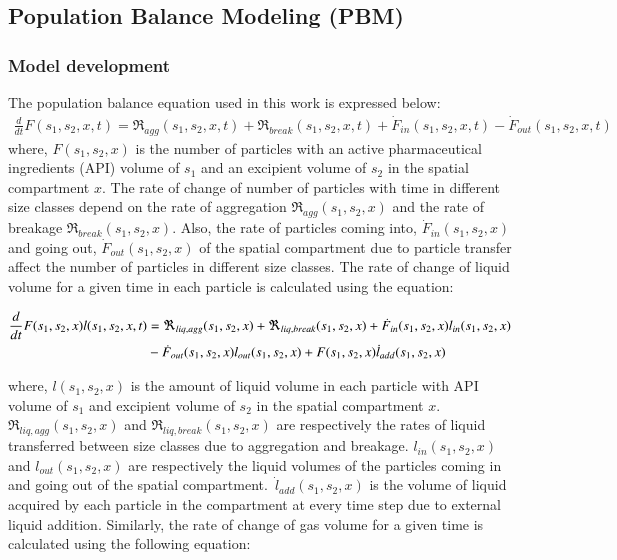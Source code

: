 \documentclass[preprint,11pt,authoryear]{elsarticle}
\begin{document}
\subsection{Population Balance Modeling (PBM)}
\label{sec:pbm_model}
\subsubsection{Model development}
 The population balance equation used in this work is expressed below:
\begin{align}
\frac{d}{dt}F(s_1,s_2,x,t)=\Re_{agg}(s_1,s_2,x,t)+\Re_{break}(s_1,s_2,x,t)+
\dot{F}_{in}(s_1,s_2,x,t)-\dot{F}_{out}(s_1,s_2,x,t)
\label{eqn:mthds_pbm_overall} 
\end{align}
where, $F(s_1,s_2,x)$ is the number of particles with an active pharmaceutical ingredients 
(API) volume of $s_1$ and an excipient 
volume of $s_2$ in the spatial compartment $x$. The rate of change of number of particles with time 
in different size classes depend on the rate of aggregation $\Re_{agg}(s_1,s_2,x)$ and the rate of 
breakage $\Re_{break}(s_1,s_2,x)$. Also, the rate of particles coming into, $\dot{F}_{in}(s_1,s_2,x)$ and 
going out, $\dot{F}_{out}(s_1,s_2,x)$ of the spatial compartment due to particle transfer affect the number of 
particles in different size classes. 
The rate of change of liquid volume for a given time in each particle is calculated using the equation: 

\begin{align}
\frac{d}{dt}F(s_1,s_2,x)l(s_1,s_2,x,t)&= 
\Re_{liq,agg}(s_1,s_2,x)+\Re_{liq,break}(s_1,s_2,x)+\dot{F}_{in}(s_1,s_2,x)l_{in}(s_1,s_2,x)\notag\\
&-\dot{F}_{out}(s_1,s_2,x)l_{out}(s_1,s_2,x)+F(s_1,s_2,x)\dot{l}_{add}(s_1,s_2,x)
\label{eqn:mthds_pbm_rate} 
\end{align}

where, $l(s_1,s_2,x)$ is the amount of liquid volume in each particle with API volume of $s_1$ and 
excipient volume of $s_2$ in the spatial compartment $x$. $\Re_{liq,agg}(s_1,s_2,x)$ and 
$\Re_{liq,break}(s_1,s_2,x)$ are respectively the rates of liquid transferred between size classes due to 
aggregation and breakage. $l_{in}(s_1,s_2,x)$ and $l_{out}(s_1,s_2,x)$ are respectively the liquid 
volumes of the particles coming in and going out of the spatial compartment.~$\dot{l}_{add}(s_1,s_2,x)$ is 
the volume of liquid acquired by each particle in the compartment at every time step due to external 
liquid addition.
Similarly, the rate of change of gas volume for a given time is calculated using the following equation: 
\end{document}
